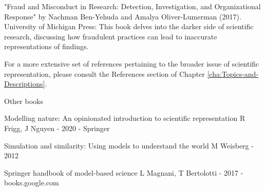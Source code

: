 "Fraud and Misconduct in Research: Detection, Investigation, and Organizational Response" by Nachman Ben-Yehuda and Amalya Oliver-Lumerman (2017). University of Michigan Press: This book delves into the darker side of scientific research, discussing how fraudulent practices can lead to inaccurate representations of findings.

For a more extensive set of references pertaining to the broader issue of scientific representation, please consult the References section of Chapter \ref{cha:Topics-and-Descriptions}.

Other books

Modelling nature: An opinionated introduction to scientific representation
R Frigg, J Nguyen - 2020 - Springer

Simulation and similarity: Using models to understand the world
M Weisberg - 2012

Springer handbook of model-based science
L Magnani, T Bertolotti - 2017 - books.google.com

